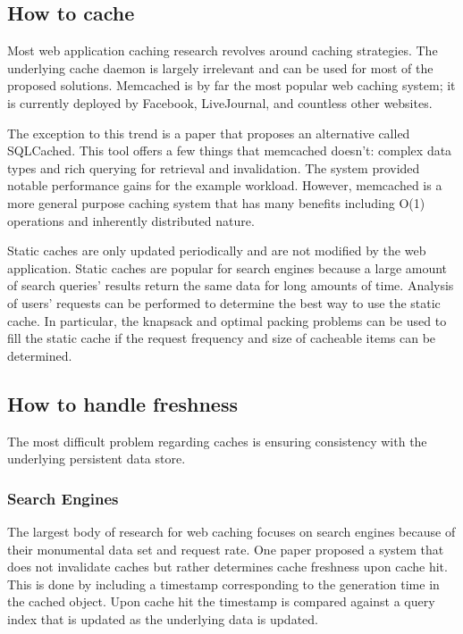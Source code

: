 \documentclass[12pt]{article}
\begin{document}
\subsection{How to cache}
Most web application caching research revolves around caching strategies.
The underlying cache daemon is largely irrelevant and can be used for most of the proposed solutions.
Memcached is by far the most popular web caching system; it is currently deployed by Facebook, LiveJournal, and countless other websites.

The exception to this trend is a paper that proposes an alternative called SQLCached. \cite{sqlCached}
This tool offers a few things that memcached doesn't: complex data types and rich querying for retrieval and invalidation.
The system provided notable performance gains for the example workload.
However, memcached is a more general purpose caching system that has many benefits including O(1) operations and inherently distributed nature.

Static caches are only updated periodically and are not modified by the web application.
Static caches are popular for search engines because a large amount of search queries' results return the same data for long amounts of time.
Analysis of users' requests can be performed to determine the best way to use the static cache.
In particular, the knapsack and optimal packing problems can be used to fill the static cache if the request frequency and size of cacheable items can be determined. \cite{designTradeOffsSearchEngine}


\subsection{How to handle freshness}
The most difficult problem regarding caches is ensuring consistency with the underlying persistent data store.

\subsubsection{Search Engines}
The largest body of research for web caching focuses on search engines because of their monumental data set and request rate.
One paper proposed a system that does not invalidate caches but rather determines cache freshness upon cache hit. \cite{cacheInvalidationWebSearch}
This is done by including a timestamp corresponding to the generation time in the cached object.
Upon cache hit the timestamp is compared against a query index that is updated as the underlying data is updated.
\end{document}
